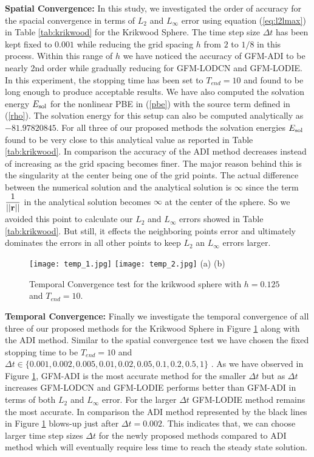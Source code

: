 \textbf{Spatial Convergence:}  In this study, we investigated the order of accuracy for the spacial convergence in terms of $L_2$ and $L_\infty$ error using equation (\ref{eq:l2lmax}) in Table \ref{tab:krikwood} for the Krikwood Sphere. The time step size $\Delta t$ has been kept fixed to $0.001$ while reducing the grid spacing $h$ from $2$ to $1/8$ in this process.  Within this range of $h$ we have noticed the accuracy of GFM-ADI to be nearly 2nd order while gradually reducing for GFM-LODCN and GFM-LODIE. In this experiment, the stopping time has been set to $T_{end} = 10$ and found to be long enough to produce acceptable results. We have also computed the solvation energy $E_{\rm sol}$ for the nonlinear PBE in (\ref{pbe}) with the source term defined in (\ref{rho}). The solvation energy for this setup can also be computed analytically as $-81.97820845$. For all three of our proposed methods the solvation energies $E_{\rm sol}$ found to be very close to this analytical value as reported in Table \ref{tab:krikwood}. In comparison the accuracy of the ADI method decreases instead of increasing as the grid spacing becomes finer. The major reason behind this is the singularity at the center being one of the grid points. The actual difference between the numerical solution and the analytical solution is $\infty$ since the term $\displaystyle \frac{1}{||{\bf r}||} $ in the analytical solution becomes $\infty$ at the center of the sphere. So we avoided this point to calculate our $L_2$ and $L_\infty$ errors  showed in Table \ref{tab:krikwood}. But still, it effects the neighboring points error and ultimately dominates the errors in all other points to keep $L_2$ an $L_\infty$ errors larger.    

\begin{figure}[!ht]
	\centering
\texttt{[image: temp\_1.jpg]}
\texttt{[image: temp\_2.jpg]}
   (a)\hspace*{3in} (b)\\ 	
	\caption{Temporal Convergence test for the krikwood sphere with $h=0.125$ and $T_{end} = 10$.}
	\label{fig:temp_Krik}
\end{figure}

\textbf{Temporal Convergence:} Finally we investigate the temporal convergence of all three of our proposed methods for the Krikwood Sphere in Figure \ref{fig:temp_Krik} along with the ADI method. Similar to the spatial convergence test we have chosen the fixed stopping time to be $T_{end} = 10$ and $\Delta t \in \{0.001, 0.002, 0.005,0.01, 0.02, 0.05, 0.1, 0.2, 0.5, 1\}$ . As we have observed in Figure \ref{fig:temp_Krik}, GFM-ADI is the most accurate method for the smaller $\Delta t$ but as $\Delta t$ increases GFM-LODCN and GFM-LODIE performs better than GFM-ADI in terms of both $L_2$ and $L_\infty$ error. For the larger $\Delta t $ GFM-LODIE method remains the most accurate. In comparison the ADI method represented by the black lines in Figure \ref{fig:temp_Krik} blows-up just after $\Delta t = 0.002$. This indicates that, we can choose larger time step sizes $\Delta t$ for the newly proposed methods compared to ADI method which will eventually require less time to reach the steady state solution.   


